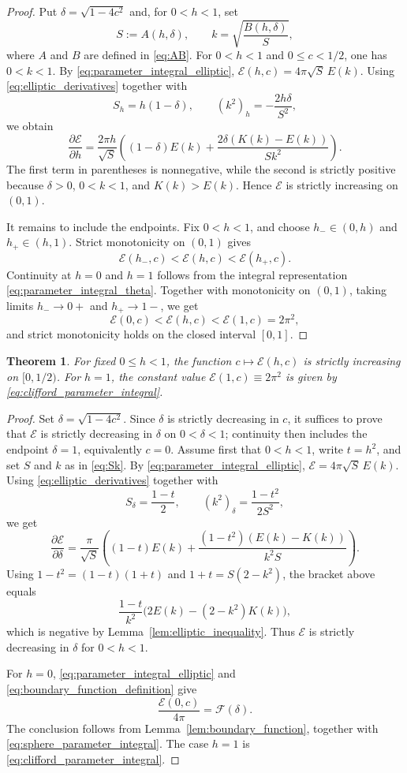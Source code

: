 \documentclass[a4paper,11pt]{amsart}
\numberwithin{equation}{section}
\theoremstyle{plain}
\newtheorem{thm}{Theorem}[section]
\begin{document}
\begin{proof}
Put $\delta=\sqrt{1-4c^2}$ and, for $0<h<1$, set
\begin{equation}\label{eq:Sk}
  S:=A(h,\delta),
\qquad
k=\sqrt{\frac{B(h,\delta)}{S}}, 
\end{equation}
where $A$ and $B$ are defined in \eqref{eq:AB}.
For $0<h<1$ and $0\le c<1/2$, one has $0<k<1$. By
\eqref{eq:parameter_integral_elliptic},
$\mathcal E(h,c)=4\pi\sqrt S\,E(k)$. Using
\eqref{eq:elliptic_derivatives} together with
\[
    S_h=h(1-\delta),
    \qquad
    (k^2)_h=-\frac{2h\delta}{S^2},
\]
we obtain
\[
\frac{\partial \mathcal E}{\partial h}
=\frac{2\pi h}{\sqrt S}
\left((1-\delta)E(k)+\frac{2\delta(K(k)-E(k))}{Sk^2}\right).
\]
The first term in parentheses is nonnegative, while the second is
strictly positive because $\delta>0$, $0<k<1$, and $K(k)>E(k)$.
Hence $\mathcal E$ is strictly increasing on $(0,1)$.

It remains to include the endpoints. Fix $0<h<1$, and choose
$h_-\in(0,h)$ and $h_+\in(h,1)$. Strict monotonicity on $(0,1)$
gives
\[
    \mathcal E(h_-,c)<\mathcal E(h,c)<\mathcal E(h_+,c).
\]
Continuity at $h=0$ and $h=1$ follows from the integral representation
\eqref{eq:parameter_integral_theta}. Together with monotonicity on $(0,1)$, taking limits $h_-\rightarrow 0+$ and $h_+\rightarrow1-$, we get
\[
    \mathcal E(0,c)<\mathcal E(h,c)<\mathcal E(1,c)=2\pi^2,
\]
and strict monotonicity holds on the closed interval $[0,1]$.
\end{proof}

\begin{thm}\label{thm:E_monotonic_c}
For fixed $0\leq h<1$, the function
$c\mapsto \mathcal E(h,c)$ is strictly increasing on $[0,1/2)$. For
$h=1$, the constant value $\mathcal E(1,c)\equiv 2\pi^2$ is given by
\eqref{eq:clifford_parameter_integral}.
\end{thm}

\begin{proof}
Set $\delta=\sqrt{1-4c^2}$. Since $\delta$ is strictly decreasing in $c$,
it suffices to prove that $\mathcal E$ is strictly decreasing in $\delta$ on
$0<\delta<1$; continuity then includes the endpoint $\delta=1$, equivalently
$c=0$.
Assume first that $0<h<1$, write $t=h^2$, and set $S$ and $k$ as in \eqref{eq:Sk}.
By \eqref{eq:parameter_integral_elliptic},
$\mathcal E=4\pi\sqrt S\,E(k)$. Using
\eqref{eq:elliptic_derivatives} together with
\[
    S_\delta=\frac{1-t}{2},
    \qquad
    (k^2)_\delta=\frac{1-t^2}{2S^2},
\]
we get
\[
\frac{\partial \mathcal E}{\partial\delta}
=
\frac{\pi}{\sqrt S}
\left((1-t)E(k)+\frac{(1-t^2)(E(k)-K(k))}{k^2S}\right).
\]
Using $1-t^2=(1-t)(1+t)$ and $1+t=S(2-k^2)$, the bracket above equals
\[
\frac{1-t}{k^2}
\bigl(2E(k)-(2-k^2)K(k)\bigr),
\]
which is negative by Lemma~\ref{lem:elliptic_inequality}. Thus
$\mathcal E$ is strictly decreasing in $\delta$ for $0<h<1$.

For $h=0$, \eqref{eq:parameter_integral_elliptic} and
\eqref{eq:boundary_function_definition} give
\[
    \frac{\mathcal E(0,c)}{4\pi}=\mathcal F(\delta).
\]
The conclusion follows from Lemma~\ref{lem:boundary_function},
together with \eqref{eq:sphere_parameter_integral}. The case $h=1$ is
\eqref{eq:clifford_parameter_integral}.
\end{proof}
\end{document}
